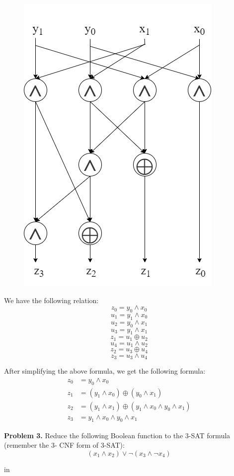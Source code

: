 \documentclass[11pt]{article}
\begin{document}
\begin{figure}[ht]
	\centering
	\includegraphics[scale=0.4]{diode.png}
\end{figure}

We have the following relation:
$$
z_0=y_0 \wedge x_0
$$
$$
u_1=y_1 \wedge x_0
$$
$$
u_2=y_0 \wedge x_1
$$
$$
u_3=y_1 \wedge x_1
$$
$$
z_1=u_1 \oplus u_2
$$
$$
u_4=u_1 \wedge u_2
$$
$$
z_2=u_3 \oplus u_4
$$
$$
z_3=u_3 \wedge u_4
$$

After simplifying the above formula, we get the following formula:
$$
\begin{aligned}
	z_0&=y_0 \wedge x_0\\
	z_1&=(y_1 \wedge x_0)\oplus(y_0 \wedge x_1)\\
	z_2&=(y_1 \wedge x_1)\oplus (y_1 \wedge x_0 \wedge y_0 \wedge x_1)\\
	z_3&=y_1 \wedge x_0 \wedge y_0 \wedge x_1
\end{aligned}
$$

\newpage
{\bf Problem 3.} Reduce the following Boolean function to the 3-SAT formula (remember the 3-
CNF form of 3-SAT):
$$
(x_1 \wedge x_2)\vee \neg(x_3 \wedge \neg x_4)
$$

 in
\end{document}
